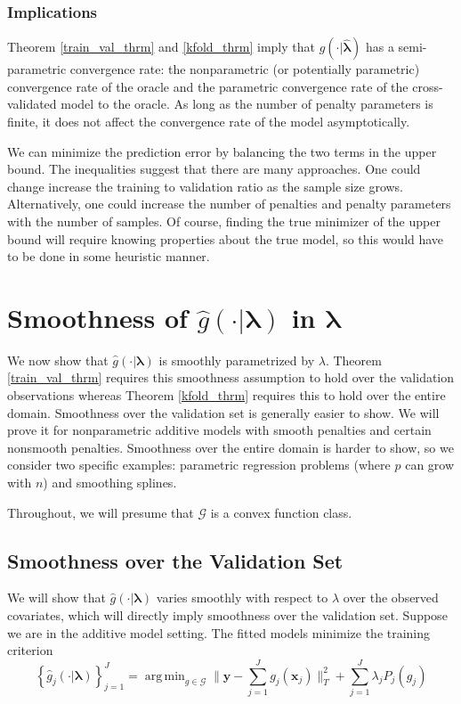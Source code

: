\documentclass[12pt]{article}
\DeclareMathOperator*{\argmin}{arg\,min}
\begin{document}
\subsubsection{Implications}
Theorem \ref{train_val_thrm} and \ref{kfold_thrm} imply that $\hat{g}(\cdot | \hat{\boldsymbol{\lambda}})$ has a semi-parametric convergence rate: the nonparametric (or potentially parametric) convergence rate of the oracle and the parametric convergence rate of the cross-validated model to the oracle. As long as the number of penalty parameters is finite, it does not affect the convergence rate of the model asymptotically.

We can minimize the prediction error by balancing the two terms in the upper bound. The inequalities suggest that there are many approaches. One could change increase the training to validation ratio as the sample size grows. Alternatively, one could increase the number of penalties and penalty parameters with the number of samples. Of course, finding the true minimizer of the upper bound will require knowing properties about the true model, so this would have to be done in some heuristic manner.

\section{Smoothness of $\hat{g}(\cdot | \boldsymbol{\lambda})$ in $\boldsymbol \lambda$}
\label{sec:entropy}

We now show that $\hat{g}(\cdot | \boldsymbol{\lambda})$ is smoothly parametrized by $\lambda$. Theorem \ref{train_val_thrm} requires this smoothness assumption to hold over the validation observations whereas Theorem \ref{kfold_thrm} requires this to hold over the entire domain. Smoothness over the validation set is generally easier to show. We will prove it for nonparametric additive models with smooth penalties and certain nonsmooth penalties. Smoothness over the entire domain is harder to show, so we consider two specific examples: parametric regression problems (where $p$ can grow with $n$) and smoothing splines.

Throughout, we will presume that $\mathcal{G}$ is a convex function class.

\subsection{Smoothness over the Validation Set}
\label{sec:smoothness_validation}
We will show that $\hat{g}(\cdot | \boldsymbol{\lambda})$ varies smoothly with respect to $\lambda$ over the observed covariates, which will directly imply smoothness over the validation set. Suppose we are in the additive model setting. The fitted models minimize the training criterion
\begin{equation}
\label{orig_train_criterion}
\left\{ \hat{g}_j(\cdot | \boldsymbol \lambda) \right \}_{j=1}^J = \argmin_{g\in \mathcal{G}} \| \boldsymbol y -  \sum_{j=1}^J g_j(\boldsymbol x_j) \|^2_T + \sum_{j=1}^J \lambda_j P_j(g_j)
\end{equation}
\end{document}
